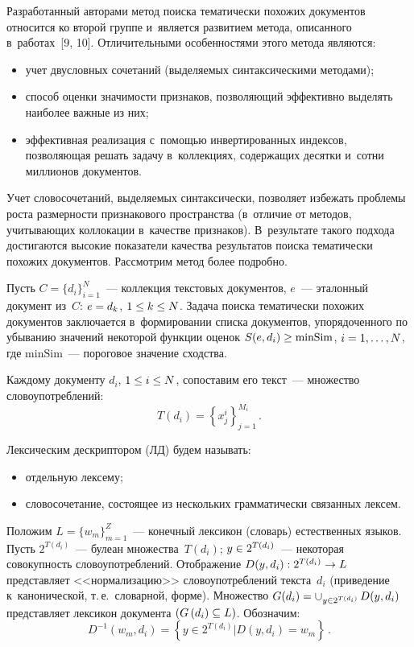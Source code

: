 \begin{multicols}{2}
  Разработанный авторами метод поиска тематически похожих документов 
относится ко второй группе и~является развитием метода, описанного 
в~работах~[9, 10]. Отличительными особенностями этого метода являются: 
  \begin{itemize}
\item учет двусловных сочетаний (выделяемых синтаксическими методами);
\item способ оценки значимости признаков, позволяющий эффективно 
выделять наиболее важные из них;
\item эффективная реализация с~помощью инвертированных индексов, 
позволяющая решать задачу в~коллекциях, содержащих десятки и~сотни 
миллионов документов.
\end{itemize}
  
  Учет словосочетаний, выделяемых синтаксически, позволяет избежать 
проблемы роста раз\-мер\-ности признакового пространства (в~отличие от 
мето\-дов, учитывающих коллокации в~качестве признаков). В~результате такого 
подхода достигаются высокие показатели качества результатов поиска 
тематически похожих документов. Рас\-смот\-рим метод более подробно.
  
  Пусть $C=\{d_i\}^N_{i=1}$~--- коллекция текстовых документов, $e$~--- 
эталонный документ из~$C$: $e\hm=d_k$, $1\hm\leq k\leq N$. Задача поиска 
тематически похожих документов заключается в~формировании списка 
документов, упорядоченного по убыванию значений некоторой функции 
оценок $S(e,d_i)\hm\geq \mathrm{minSim}$, $i\hm=1,\ldots, N$, где $\mathrm{minSim}$~--- пороговое 
значение сходства.
  
  Каждому документу $d_i$, $1\hm\leq i\hm\leq N$, сопоставим его текст~--- 
множество словоупотреблений:
$$
T\left(d_i\right)= \left\{x_j^i\right\}_{j=1}^{M_i}\,.
$$

Лексическим дескриптором (ЛД) будем называть:
  \begin{itemize}
\item отдельную лексему;\\[-14pt]
\item словосочетание, состоящее из нескольких грамматически связанных 
лексем.
\end{itemize}

  Положим $L=\{w_m\}^Z_{m=1}$~--- конечный лексикон (словарь) 
естественных языков. Пусть $2^{T(d_i)}$~--- булеан множества~$T(d_i)$; 
$y\hm\in 2^{T(d_i)}$~--- некоторая совокупность словоупотреблений. 
Отображение $D(y,d_i):2^{T(d_i)}\hm\to L$ представляет <<нормализацию>> 
словоупотреблений текста~$d_i$ (приведение к~канонической, т.\,е.\ словарной, 
форме). Множество $G(d_i)\hm= \mathop{\cup}_{y\in 2^{T(d_i)}} D(y,d_i)$ 
представляет лексикон документа $\left(G \left(d_i\right)\hm\subseteq L\right)$. Обозначим:
$$
D^{-1}\left(w_m,d_i\right)=\left\{ y\in 2^{T(d_i)}\vert D\left(y,d_i\right)=w_m\right\}\,.
$$


\end{multicols}
